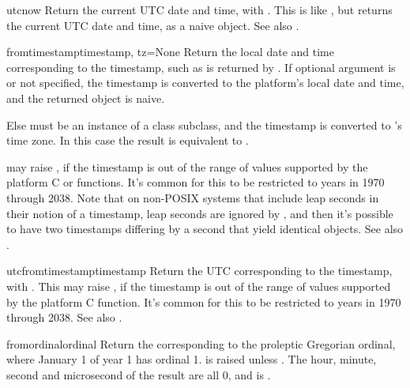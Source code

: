 \begin{methoddesc}{utcnow}{}
  Return the current UTC date and time, with  .
  This is like , but returns the current UTC date and time,
  as a naive  object.
  See also .
\end{methoddesc}

\begin{methoddesc}{fromtimestamp}{timestamp, tz=None}
  Return the local date and time corresponding to the \POSIX{}
  timestamp, such as is returned by .
  If optional argument  is  or not specified, the
  timestamp is converted to the platform's local date and time, and
  the returned  object is naive.

  Else  must be an instance of a class  subclass,
  and the timestamp is converted to 's time zone.  In this case
  the result is equivalent to
  .

   may raise , if the
  timestamp is out of the range of values supported by the platform C
   or  functions.  It's common
  for this to be restricted to years in 1970 through 2038.
  Note that on non-POSIX systems that include leap seconds in their
  notion of a timestamp, leap seconds are ignored by
  , and then it's possible to have two timestamps
  differing by a second that yield identical  objects.
  See also .
\end{methoddesc}

\begin{methoddesc}{utcfromtimestamp}{timestamp}
  Return the UTC  corresponding to the \POSIX{}
  timestamp, with  .
  This may raise , if the
  timestamp is out of the range of values supported by the platform
  C  function.  It's common for this to be
  restricted to years in 1970 through 2038.
  See also .
\end{methoddesc}

\begin{methoddesc}{fromordinal}{ordinal}
  Return the  corresponding to the proleptic
  Gregorian ordinal, where January 1 of year 1 has ordinal 1.
   is raised unless .  The hour, minute, second and
  microsecond of the result are all 0,
  and  is .
\end{methoddesc}

